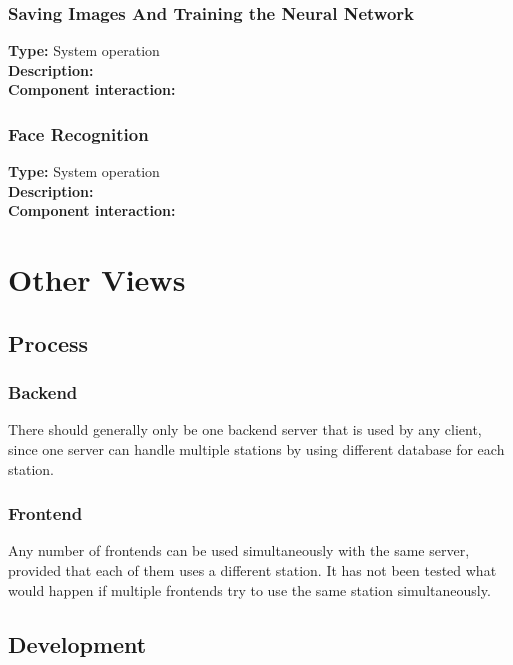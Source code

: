 \documentclass[11pt]{article}
\begin{document}
\subsubsection{Saving Images And Training the Neural Network}
\label{sec:add-train}
\textbf{Type:} System operation\\
\textbf{Description:}\\
\textbf{Component interaction:}\\

\subsubsection{Face Recognition}
\label{sec:recognition}
\textbf{Type:} System operation\\
\textbf{Description:}\\
\textbf{Component interaction:}\\

\section{Other Views}


\subsection{Process}
\subsubsection{Backend}
There should generally only be one backend server that is used by any
client, since one server can handle multiple stations by using
different database for each station.

\subsubsection{Frontend}
Any number of frontends can be used simultaneously with the same
server, provided that each of them uses a different station. It has
not been tested what would happen if multiple frontends try to use the
same station simultaneously.

\subsection{Development}
\end{document}
